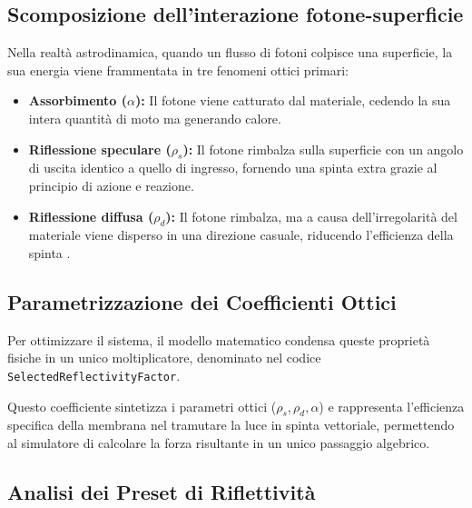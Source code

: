 
\subsection{Scomposizione dell'interazione fotone-superficie}

Nella realtà astrodinamica, quando un flusso di fotoni colpisce una superficie, la sua energia viene frammentata in tre fenomeni ottici primari:
\begin{itemize}
    \item \textbf{Assorbimento ($\alpha$):} Il fotone viene catturato dal materiale, cedendo la sua intera quantità di moto ma generando calore.
    \item \textbf{Riflessione speculare ($\rho_s$):} Il fotone rimbalza sulla superficie con un angolo di uscita identico a quello di ingresso, fornendo una spinta extra grazie al principio di azione e reazione.
    \item \textbf{Riflessione diffusa ($\rho_d$):} Il fotone rimbalza, ma a causa dell'irregolarità del materiale viene disperso in una direzione casuale, riducendo l'efficienza della spinta \cite{mcinnes1999solar}.
\end{itemize}


\subsection{Parametrizzazione dei Coefficienti Ottici}

Per ottimizzare il sistema, il modello matematico condensa queste proprietà fisiche in un unico moltiplicatore, denominato nel codice \lstinline|SelectedReflectivityFactor|. 

Questo coefficiente sintetizza i parametri ottici ($\rho_s, \rho_d, \alpha$) e rappresenta l'efficienza specifica della membrana nel tramutare la luce in spinta vettoriale, permettendo al simulatore di calcolare la forza risultante in un unico passaggio algebrico.


\subsection{Analisi dei Preset di Riflettività}

